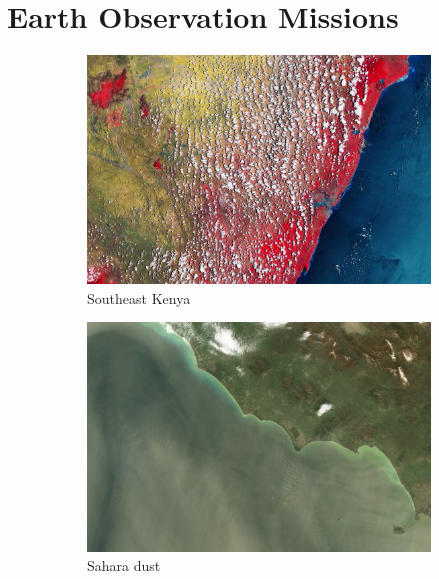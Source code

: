 \documentclass[conference]{IEEEtran}
\begin{document}
\section{Earth Observation Missions}
\label{sec:system_model}

\begin{figure}
  \begin{subfigure}{.32\linewidth}
    \includegraphics[width=\linewidth]{figures/Earth_from_Space_Southeast_Kenya}
    \caption{Southeast Kenya}
    \label{fig:sentinel_kenya}
  \end{subfigure}
  \hfill
  \begin{subfigure}{.32\linewidth}
    \includegraphics[width=\linewidth]{figures/Saharan_dust_plume}
    \caption{Sahara dust}
    \label{fig:sentinel_sahara}
  \end{subfigure}
  \hfill
  \begin{subfigure}{.32\linewidth}

\end{subfigure}
\end{figure}
\end{document}
